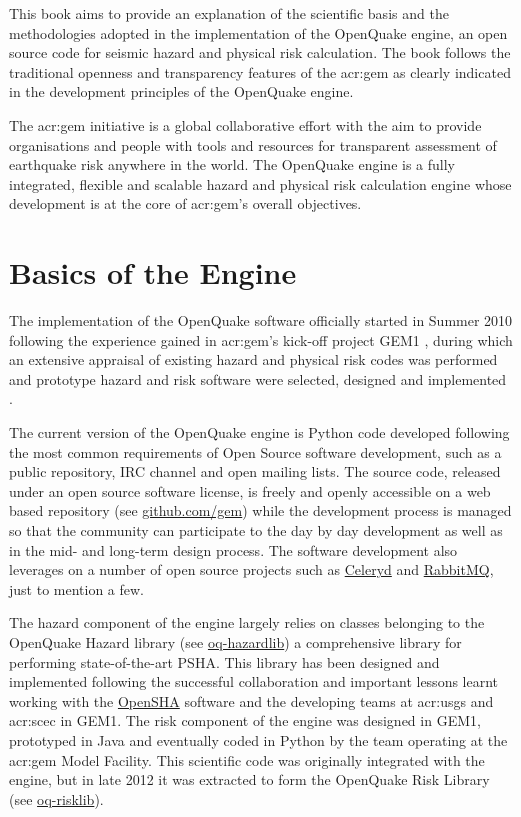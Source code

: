 This book aims to provide an explanation of the scientific basis 
and the methodologies adopted in the implementation of the OpenQuake engine, an open source code for seismic hazard and physical risk calculation. 
%
The book follows the traditional openness and transparency features of the 
\gls{acr:gem} as clearly indicated in the development principles of 
the OpenQuake engine. 

%
The \gls{acr:gem} initiative is a global collaborative effort with the aim to provide organisations and people with tools and resources for transparent assessment of earthquake risk anywhere in the world.
%
The OpenQuake engine is a fully integrated, flexible and scalable hazard and physical risk 
calculation engine whose development is at the core of \gls{acr:gem}'s
overall objectives.
\section{Basics of the Engine}
The implementation of the OpenQuake software officially started in Summer 2010 
following the experience gained in \gls{acr:gem}'s kick-off project GEM1 
\citep{gemfoundation2010}, during which an extensive appraisal of existing hazard 
and physical risk codes was performed \citep{danciu2010,crowley2010}
and prototype hazard and risk software were selected, designed and
implemented \citep{pagani2010,crowley2010a}.

The current version of the OpenQuake engine is Python code developed 
following the most common requirements of Open Source 
software development, such as a public repository, IRC channel and open mailing lists. 
The source code, released under an open source software license,
is freely and openly accessible on a web based repository 
(see \href{http://github.com/gem}{github.com/gem}) while the 
development process is managed so that the community can participate 
to the day by day development as well as in the mid- and long-term 
design process. 
%
The software development also leverages on a number of open source projects 
such as \href {http://celeryproject.org}{Celeryd} and \href{http://www.rabbitmq.com}{RabbitMQ}, just to mention a few.

The hazard component of the engine largely relies on classes belonging to the OpenQuake Hazard library (see \href{https://github.com/gem/oq-hazardlib}{oq-hazardlib}) a comprehensive library for performing state-of-the-art PSHA. This library has been designed and implemented following the successful collaboration and important lessons learnt working with the \href{http://www.opensha.org}{OpenSHA} software and the developing teams at \gls{acr:usgs} and 
\gls{acr:scec} in GEM1. 
%
The risk component of the engine was designed in GEM1, prototyped in Java and eventually
coded in Python by the team operating at the \gls{acr:gem} 
Model Facility. This scientific code was originally integrated with the engine, but in late 2012 it was extracted to form the OpenQuake Risk Library (see \href{https://github.com/gem/oq-risklib}{oq-risklib}).

